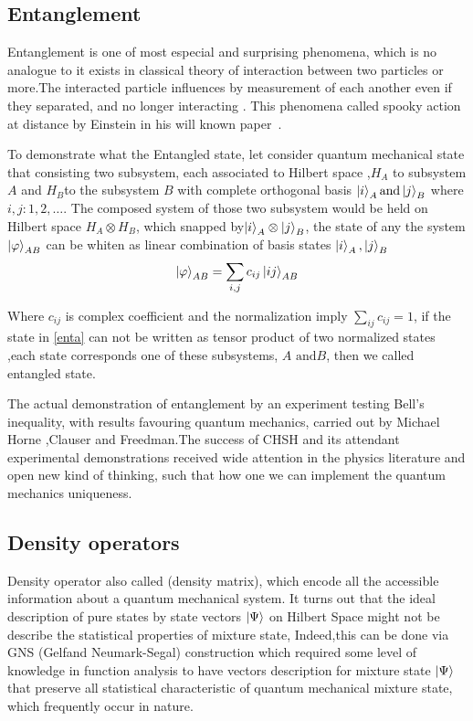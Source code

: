 \subsection{Entanglement}\hfill \break
Entanglement is one of most especial and surprising phenomena, which is no analogue to it exists in classical theory of interaction between two particles or more\citep{PhysRevLett.78.5022}.The interacted particle influences by measurement of each another even if they separated, and no longer interacting . This phenomena called spooky action at distance by Einstein in his will known paper~\cite{EPR}.

To demonstrate what the Entangled state, let consider quantum mechanical state that consisting two subsystem, each associated to Hilbert space ,$H_A$ to subsystem $A$ and $H_B$to the subsystem $B$ with complete orthogonal basis $\ket{i}_A \text{and} \ket{j}_B$ where $i,j:1,2,\dots$. 
The composed system of those two subsystem would be held on Hilbert space $H_A\otimes H_B$, which snapped by$\ket{i}_A \otimes \ket{j}_B$, the state of any the system $\ket{\varphi}_{AB}$ can be whiten as linear combination of basis states $\ket{i}_A ,\ket{j}_B$
\begin{equation}\label{enta}
\ket{\varphi}_{AB}=\sum_{i,j} c_{ij} \ket{ij}_{AB}
\end{equation}

Where $c_{ij}$ is complex coefficient and the normalization imply $\sum_{ij} c_{ij}=1$, if the state in \ref{enta} can not be written as tensor product of two normalized states ,each state corresponds  one of these subsystems, $A\text{ and} B$, then we called entangled state.

The actual demonstration of entanglement by an experiment testing Bell’s inequality, with results favouring quantum mechanics, carried out by Michael Horne ,Clauser and Freedman\citep{PhysRevLett.23.880}.The success of CHSH and its attendant experimental demonstrations received wide attention in the physics literature and open new kind of thinking, such that how one we can implement the quantum mechanics uniqueness.


\subsection{Density operators}\label{DMO}\hfill \break
Density operator also called (density matrix), which encode all the accessible information about a quantum mechanical system. It turns out that the ideal description of pure states by state vectors $\ket{\Psi}$ on Hilbert Space might not be describe the statistical properties of mixture state, Indeed,this can be done via GNS (Gelfand Neumark-Segal) construction \citep{book:72351}which required some level of knowledge in function analysis to have vectors description for mixture state $\ket{\Psi}$ that preserve all statistical characteristic of quantum mechanical mixture state, which frequently occur in nature.

